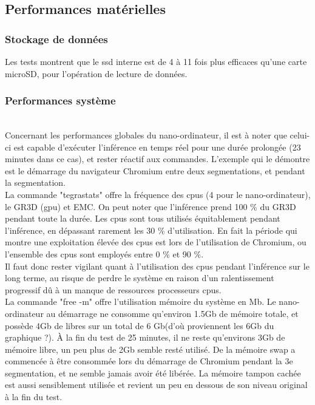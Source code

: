 ﻿\subsection{Performances matérielles}
\subsubsection{Stockage de données}
\noindent Les tests montrent que le \acrshort{ssd} interne est de 4 à 11 fois plus efficaces qu'une carte microSD, pour l'opération de lecture de données. 
\subsubsection{Performances système}
\vspace{0.5\baselineskip}
\\
\noindent Concernant les performances globales du nano-ordinateur, il est à noter que celui-ci est capable d'exécuter l'inférence en temps réel pour une durée prolongée (23 minutes dans ce cas), et rester réactif aux commandes. L'exemple qui le démontre est le démarrage du navigateur Chromium entre deux segmentations, et pendant la segmentation.
\vspace{0.5\baselineskip}
\\
\noindent La commande "tegrastats" offre la fréquence des \acrshort{cpu}s (4 pour le nano-ordinateur), le GR3D (\acrshort{gpu}) et EMC. On peut noter que l'inférence prend 100 \% du GR3D pendant toute la durée. Les \acrshort{cpu}s sont tous utilisés équitablement pendant l'inférence, en dépassant rarement les 30 \% d'utilisation. En fait la période qui montre une exploitation élevée des \acrshort{cpu}s est lors de l'utilisation de Chromium, ou l'ensemble des \acrshort{cpu}s sont employés entre 0 \% et 90 \%. 
\vspace{0.5\baselineskip}
\\
\noindent Il faut donc rester vigilant quant à l'utilisation des \acrshort{cpu}s pendant l'inférence sur le long terme, au risque de perdre le système en raison d'un ralentissement progressif dû à un manque de ressources processeurs \acrshort{cpu}s.
\vspace{0.5\baselineskip}
\\
\noindent La commande "free -m" offre l'utilisation mémoire du système en Mb. Le nano-ordinateur au démarrage ne consomme qu'environ 1.5Gb de mémoire totale, et possède 4Gb de libres sur un total de 6 Gb(d'où proviennent les 6Gb du graphique ?). À la fin du test de 25 minutes, il ne reste qu'environs 3Gb de mémoire libre, un peu plus de 2Gb semble resté utilisé. De la mémoire swap a commencée à être consommée lors du démarrage de Chromium pendant la 3e segmentation, et ne semble jamais avoir été libérée. La mémoire tampon cachée est aussi sensiblement utilisée et revient un peu en dessous de son niveau original à la fin du test. 
